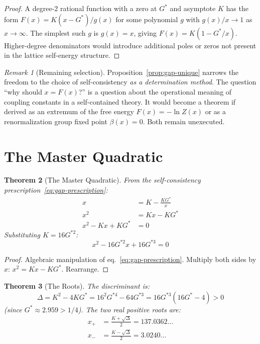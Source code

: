 \documentclass[12pt]{article}
\newtheorem{theorem}{Theorem}[section]
\theoremstyle{definition}
\theoremstyle{remark}
\newtheorem{remark}[theorem]{Remark}
\begin{document}
\begin{proof}
A degree-2 rational function with a zero at $G^*$ and asymptote $K$ has the form $F(x) = K(x - G^*)/g(x)$ for some polynomial $g$ with $g(x)/x \to 1$ as $x \to \infty$. The simplest such $g$ is $g(x) = x$, giving $F(x) = K(1 - G^*/x)$. Higher-degree denominators would introduce additional poles or zeros not present in the lattice self-energy structure. \qedhere
\end{proof}

\begin{remark}[Remaining selection]
Proposition~\ref{prop:gap-unique} narrows the freedom to the choice of self-consistency \emph{as a determination method}. The question ``why should $x = F(x)$?'' is a question about the operational meaning of coupling constants in a self-contained theory. It would become a theorem if derived as an extremum of the free energy $F(x) = -\ln Z(x)$ or as a renormalization group fixed point $\beta(x) = 0$. Both remain unexecuted.
\end{remark}

\section{The Master Quadratic}
\label{sec:quadratic}

\begin{theorem}[The Master Quadratic]
\label{thm:master}
From the self-consistency prescription~\eqref{eq:gap-prescription}:
\begin{align}
    x &= K - \frac{KG^*}{x} \nonumber\\
    x^2 &= Kx - KG^* \nonumber\\
    x^2 - Kx + KG^* &= 0
\end{align}
Substituting $K = 16G^{*2}$:
\begin{equation}
    \boxed{\;x^2 - 16G^{*2}x + 16G^{*3} = 0\;}
    \label{eq:master}
\end{equation}
\end{theorem}

\begin{proof}
Algebraic manipulation of eq.~\eqref{eq:gap-prescription}. Multiply both sides by $x$: $x^2 = Kx - KG^*$. Rearrange.
\end{proof}

\begin{theorem}[The Roots]
\label{thm:roots}
The discriminant is:
\begin{equation}
    \Delta = K^2 - 4KG^* = 16^2 G^{*4} - 64G^{*3} = 16G^{*3}(16G^* - 4) > 0
\end{equation}
(since $G^* \approx 2.959 > 1/4$). The two real positive roots are:
\begin{align}
    x_+ &= \frac{K + \sqrt{\Delta}}{2} = 137.0362\ldots \label{eq:xplus}\\
    x_- &= \frac{K - \sqrt{\Delta}}{2} = 3.0240\ldots \label{eq:xminus}
\end{align}
\end{theorem}
\end{document}
